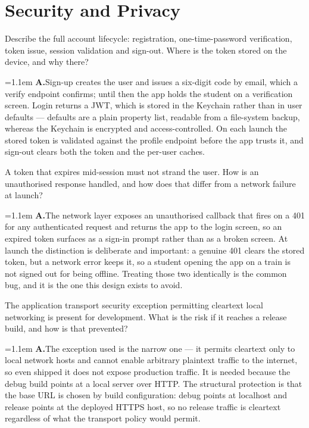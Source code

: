 \documentclass[11pt,a4paper]{article}
\newcommand{\ans}[1]{%
  \par\vspace{0.32em}%
  \begingroup
  \small\color{answerink}%
  \leftskip=1.1em
  \noindent\textbf{\color{accent}A.}\hspace{0.45em}#1\par
  \endgroup
  \vspace{0.1em}%
}
\begin{document}
\section{Security and Privacy}
\begin{questions}[resume]

\item Describe the full account lifecycle: registration, one-time-password
verification, token issue, session validation and sign-out. Where is the token
stored on the device, and why there?
\ans{Sign-up creates the user and issues a six-digit code by email, which a verify
endpoint confirms; until then the app holds the student on a verification screen.
Login returns a JWT, which is stored in the Keychain rather than in user defaults
--- defaults are a plain property list, readable from a file-system backup,
whereas the Keychain is encrypted and access-controlled. On each launch the stored
token is validated against the profile endpoint before the app trusts it, and
sign-out clears both the token and the per-user caches.}

\item A token that expires mid-session must not strand the user. How is an
unauthorised response handled, and how does that differ from a network failure at
launch?
\ans{The network layer exposes an unauthorised callback that fires on a 401 for
any authenticated request and returns the app to the login screen, so an expired
token surfaces as a sign-in prompt rather than as a broken screen. At launch the
distinction is deliberate and important: a genuine 401 clears the stored token,
but a network error keeps it, so a student opening the app on a train is not
signed out for being offline. Treating those two identically is the common bug,
and it is the one this design exists to avoid.}

\item The application transport security exception permitting cleartext local
networking is present for development. What is the risk if it reaches a release
build, and how is that prevented?
\ans{The exception used is the narrow one --- it permits cleartext only to local
network hosts and cannot enable arbitrary plaintext traffic to the internet, so
even shipped it does not expose production traffic. It is needed because the
debug build points at a local server over HTTP. The structural protection is that
the base URL is chosen by build configuration: debug points at localhost and
release points at the deployed HTTPS host, so no release traffic is cleartext
regardless of what the transport policy would permit.}

\end{questions}
\end{document}
